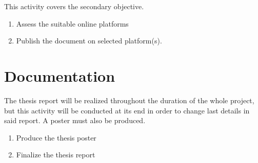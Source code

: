 This activity covers the  secondary objective.

\begin{enumerate}
	\item Assess the suitable online platforms
	\item Publish the document on selected platform(s).
\end{enumerate}


\section{Documentation}
\label{sec:activities_documentation}

The thesis report will be realized throughout the duration of the whole project, but this activity will be conducted at its end in order to change last details in said report. A poster must also be produced.

\begin{enumerate}
    \item Produce the thesis poster
    \item Finalize the thesis report
\end{enumerate}